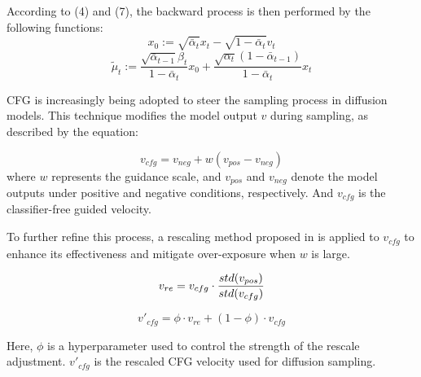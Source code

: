 \documentclass{Interspeech2024}
\begin{document}
According to (4) and (7), the backward process is then performed by the following functions:
\begin{equation}
x_{0}:=\sqrt{\bar{\alpha}_{t}} x_{t}-\sqrt{1-\bar{\alpha}_{t}} v_{t}
\end{equation}
\begin{equation}
\tilde{\mu}_{t}:=\frac{\sqrt{\bar{\alpha}_{t-1}} \beta_{t}}{1-\bar{\alpha}_{t}} x_{0}+\frac{\sqrt{\alpha_{t}}\left(1-\bar{\alpha}_{t-1}\right)}{1-\bar{\alpha}_{t}} x_{t}
\end{equation}

CFG \cite{ho2022classifier} is increasingly being adopted to steer the sampling process in diffusion models. This technique modifies the model output $v$ during sampling, as described by the equation:

\begin{equation}
v_{cfg} = v_{neg} + w (v_{pos}-v_{neg}) 
\end{equation}
 where $w$ represents the guidance scale, and $v_{pos}$ and $v_{neg}$ denote the model outputs under positive and negative conditions, respectively. And $v_{cfg}$ is the classifier-free guided velocity.
 
 To further refine this process, a rescaling method proposed in \cite{lin2024common} is applied to $v_{cfg}$ to enhance its effectiveness and mitigate over-exposure when $w$ is large.

\begin{equation}
v_{re} = v_{cfg} \cdot \frac{std(v_{pos})}{std(v_{cfg})} \\
\end{equation}

\begin{equation}
v'_{cfg}=\phi \cdot v_{re}+(1-\phi) \cdot v_{c f g}
\end{equation}

Here, $\phi$ is a hyperparameter used to control the strength of the rescale adjustment. $v'_{cfg}$ is the rescaled CFG velocity used for diffusion sampling. 
\end{document}
